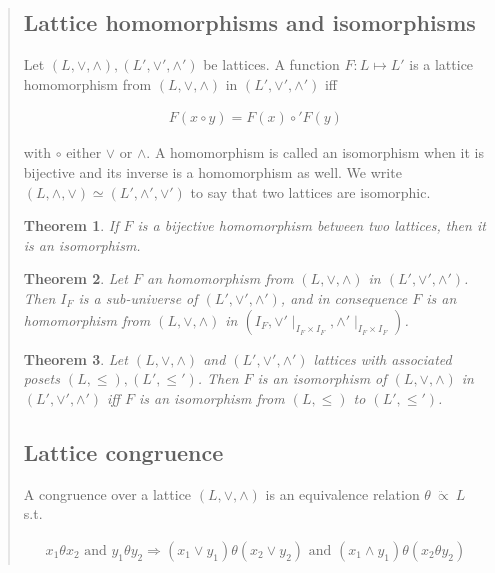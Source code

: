 \documentclass[a4paper, 12pt]{article}
\newtheorem{theorem}{Theorem}
\newtheorem{theorem}{Theorem}
\begin{document}
\begin{quote}
\begin{quote}
\end{quote}
\normalsize

\subsection{Lattice homomorphisms and isomorphisms}

Let $(L, \lor, \land), (L', \lor', \land')$ be lattices. A function $F : L
\mapsto L'$ is a lattice homomorphism from $(L, \lor, \land)$ in $(L', \lor',
\land')$ iff 

\begin{align*}
    F(x \circ y) = F(x) \circ' F(y)
\end{align*}

with $\circ$ either $\lor$ or $\land$. A homomorphism is called an isomorphism
when it is bijective and its inverse is a homomorphism as well. We write $(L,
\land, \lor)
\simeq (L', \land', \lor') $ to say that two lattices are isomorphic.

\begin{theorem}
    If $F$ is a bijective homomorphism between two lattices, then it is an
    isomorphism.
\end{theorem}

\begin{theorem}
    Let $F$ an homomorphism from  $(L, \lor, \land) $ in $ (L', \lor',
    \land')$. Then $I_F$ is a sub-universe of $(L', \lor', \land')$, and in
    consequence $F$ is an homomorphism from $(L, \lor, \land)$ in $(I_F,
    \lor'\mid_{I_F \times I_F}, \land'\mid_{I_F \times I_F})$.
\end{theorem}

\begin{theorem}
    Let $(L, \lor, \land )$ and $(L', \lor ', \land ')$ lattices with associated
    posets $(L, \leq), (L', \leq')$. Then $F$ is an isomorphism of $(L, \lor ,
    \land )$ in $(L', \lor ', \land ')$ iff $F$ is an isomorphism from $(L,
    \leq)$ to $(L', \leq')$.
\end{theorem}

\subsection{Lattice congruence}

A congruence over a lattice $(L, \lor , \land )$ is an equivalence relation
$\theta ~ \ddot{\propto} ~ L$ s.t. 

\begin{align*}
    x_1 \theta x_2 \text{ and } y_1 \theta y_2 \Rightarrow (x_1 \lor  y_1)
    \theta (x_2 \lor  y_2) \text{ and } (x_1 \land y_1) \theta (x_2 \theta y_2)
\end{align*}


\end{quote}
\end{document}
